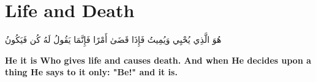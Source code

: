 \chapter{Life and Death}
\begin{center}
    {\Huge    
        \begin{Arabic}
            هُوَ الَّذِي يُحْيِي وَيُمِيتُ فَإِذَا قَضَىٰ أَمْرًا فَإِنَّمَا يَقُولُ لَهُ كُن فَيَكُونُ
        \end{Arabic}
    }
\end{center}
\vspace*{\fill}
\vspace{3cm}
\begin{center}
    \large \textbf{He it is Who gives life and causes death. And when He decides upon a thing He says to it only: "Be!" and it is.}
\end{center}
